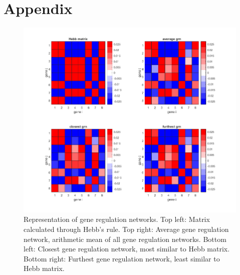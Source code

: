 \documentclass{article}
\begin{document}
\section{Appendix}

\begin{figure}[H]
	\includegraphics[width=\linewidth]{./img/results/pop100.png}
	\caption{Representation of gene regulation networks. Top left: Matrix calculated through Hebb's rule. Top right: Average gene regulation network, arithmetic mean of all gene regulation networks. Bottom left: Closest gene regulation network, most similar to Hebb matrix. Bottom right: Furthest gene regulation network, least similar to Hebb matrix.}
	\label{fig:pop100}
\end{figure}


\begin{appendix}
   
  
\end{appendix}
\end{document}
